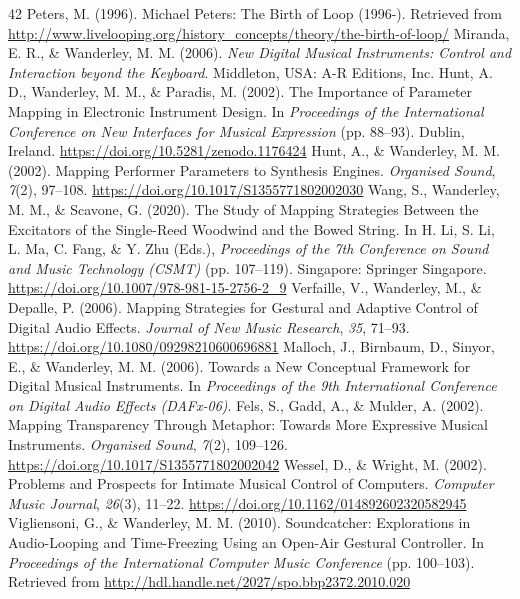 \documentclass[sigconf]{nimeart}
\begin{document}
\begin{thebibliography}{42}
 {{ }}  Peters, M. (1996). Michael Peters: The Birth of Loop (1996-). Retrieved from \url{http://www.livelooping.org/history_concepts/theory/the-birth-of-loop/}{}
 {{ }}  Miranda, E. R., \& Wanderley, M. M. (2006). \emph{New Digital Musical Instruments: Control and Interaction beyond the Keyboard}. Middleton, USA: A-R Editions, Inc.{}
 {{ }}  Hunt, A. D., Wanderley, M. M., \& Paradis, M. (2002). The Importance of Parameter Mapping in Electronic Instrument Design. In \emph{Proceedings of the International Conference on New Interfaces for Musical Expression} (pp. 88--93). Dublin, Ireland. \url{https://doi.org/10.5281/zenodo.1176424}{}
 {{ }}  Hunt, A., \& Wanderley, M. M. (2002). Mapping Performer Parameters to Synthesis Engines. \emph{Organised Sound}, \emph{7}(2), 97--108. \url{https://doi.org/10.1017/S1355771802002030}{}
 {{ }}  Wang, S., Wanderley, M. M., \& Scavone, G. (2020). The Study of Mapping Strategies Between the Excitators of the Single-Reed Woodwind and the Bowed String. In H. Li, S. Li, L. Ma, C. Fang, \& Y. Zhu (Eds.), \emph{Proceedings of the 7th Conference on Sound and Music Technology (CSMT)} (pp. 107--119). Singapore: Springer Singapore. \url{https://doi.org/10.1007/978-981-15-2756-2_9}{}
 {{ }}  Verfaille, V., Wanderley, M., \& Depalle, P. (2006). Mapping Strategies for Gestural and Adaptive Control of Digital Audio Effects. \emph{Journal of New Music Research}, \emph{35}, 71--93. \url{https://doi.org/10.1080/09298210600696881}{}
 {{ }}  Malloch, J., Birnbaum, D., Sinyor, E., \& Wanderley, M. M. (2006). Towards a New Conceptual Framework for Digital Musical Instruments. In \emph{Proceedings of the 9th International Conference on Digital Audio Effects (DAFx-06)}.{}
 {{ }}  Fels, S., Gadd, A., \& Mulder, A. (2002). Mapping Transparency Through Metaphor: Towards More Expressive Musical Instruments. \emph{Organised Sound}, \emph{7}(2), 109--126. \url{https://doi.org/10.1017/S1355771802002042}{}
 {{ }}  Wessel, D., \& Wright, M. (2002). Problems and Prospects for Intimate Musical Control of Computers. \emph{Computer Music Journal}, \emph{26}(3), 11--22. \url{https://doi.org/10.1162/014892602320582945}{}
 {{ }}  Vigliensoni, G., \& Wanderley, M. M. (2010). Soundcatcher: Explorations in Audio-Looping and Time-Freezing Using an Open-Air Gestural Controller. In \emph{Proceedings of the International Computer Music Conference} (pp. 100--103). Retrieved from \url{http://hdl.handle.net/2027/spo.bbp2372.2010.020}{}

\end{thebibliography}
\end{document}
